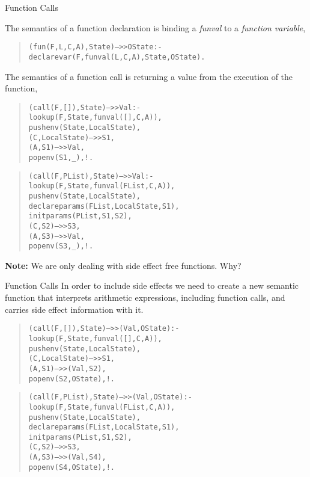 \documentclass{beamer}
\begin{document}
\begin{frame}[fragile]{Function Calls}
\scriptsize

The semantics of a function declaration is binding a {\em funval} to a {\em function variable},
{\tiny
\begin{quote}
\begin{alltt}
(fun(F,L,C,A),State) -->> OState :-        % function declaration
    declarevar(F,{\color{red}funval(L,C,A)},State,OState).
\end{alltt}
\end{quote}
}
The semantics of a function call is returning a value from the execution of the function,
{\tiny
\begin{quote}
\begin{alltt}
(call(F,[ ]),State) -->> Val :-        % function call
    lookup(F,State,{\color{red}funval([ ],C,A))},
    pushenv(State,LocalState),
    ({\color{red}C},LocalState) -->> S1,
    ({\color{red}A},S1) -->> Val,
    popenv(S1,_),!.      % TROUBLE!!!
\end{alltt}
\end{quote}
\begin{quote}
\begin{alltt}
(call(F,PList),State) -->> Val :-        % function call
    lookup(F,State,{\color{red}funval(FList,C,A))},
    pushenv(State,LocalState),
    declareparams(FList,LocalState,S1),
    initparams(PList,S1,S2),    
    ({\color{red}C},S2) -->> S3,
    ({\color{red}A},S3) -->> Val,
    popenv(S3,_),!.      % TROUBLE!!!
\end{alltt}
\end{quote}
}
{\bf Note:} We are only dealing with side effect free functions. Why?

\end{frame}


\begin{frame}[fragile]{Function Calls}
\scriptsize
In order to include side effects we need to create a new semantic function
that interprets arithmetic expressions, including function calls, and carries side effect information
with it.

{\tiny
\begin{quote}
\begin{alltt}
(call(F,[ ]),State) -->> {\color{red}(Val,OState)} :-        % function call
    lookup(F,State,funval([ ],C,A)),
    pushenv(State,LocalState),
    (C,LocalState) -->> S1,
   (A,S1) -->> {\color{red}(Val,S2)},
    popenv(S2,{\color{red}OState}),!.     
\end{alltt}
\end{quote}
\begin{quote}
\begin{alltt}
(call(F,PList),State) -->> {\color{red}(Val,OState)} :-        % function call
    lookup(F,State,funval(FList,C,A)),
    pushenv(State,LocalState),
    declareparams(FList,LocalState,S1),
    initparams(PList,S1,S2),    
    (C,S2) -->> S3,
    (A,S3) -->> {\color{red}(Val,S4)},
    popenv(S4,{\color{red}OState}),!.
\end{alltt}
\end{quote}
}
\end{frame}
\end{document}

